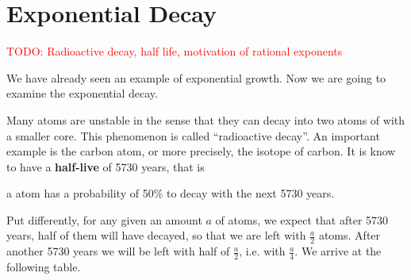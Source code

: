 \section*{Exponential Decay}
\textcolor{red}{TODO: Radioactive decay, half life, motivation of rational exponents}

We have already seen an example of exponential growth.
Now we are going to examine the exponential decay.

Many atoms are unstable in the sense that they can decay into two atoms of with a smaller core.
This phenomenon is called ``radioactive decay''.
An important example is the carbon atom, or more precisely, the  isotope of carbon.
It is know to have a \textbf{half-live} of 5730 years, that is
\begin{center}
	a  atom has a probability of 50\% to decay with the next 5730 years.
\end{center}
Put differently, for any given an amount $a$ of  atoms, we expect that after 5730 years, half of them will have decayed, so that we are left with $\frac{a}{2}$ atoms.
After another 5730 years we will be left with half of $\frac{a}{2}$, i.e. with $\frac{a}{4}$.
We arrive at the following table.
\begin{figure}[ht]
	\centering
\end{figure}
